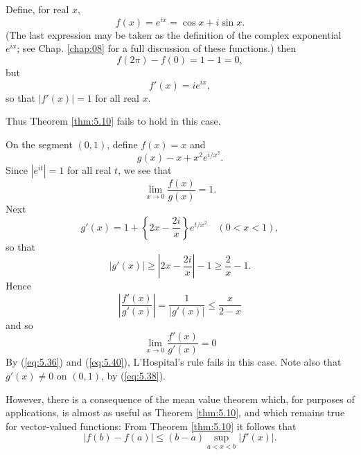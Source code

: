 \begin{newexample}
    Define, for real $x$,
    \begin{equation}
        \label{eq:5.32}
        f(x) = e^{ix} = \cos x + i \sin x.
    \end{equation}
    (The last expression may be taken as the definition of the complex exponential $e^{ix}$; see Chap. \ref{chap:08} for a full discussion of these functions.)
    then
    \begin{equation}
        \label{eq:5.33}
        f(2 \pi) - f(0) = 1 - 1 = 0,
    \end{equation}
    but
    \begin{equation}
        f'(x) = ie^{ix},
    \end{equation}
    so that $\left| f'(x) \right| = 1$ for all real $x$.

    Thus Theorem \ref{thm:5.10} fails to hold in this case.
\end{newexample}

\begin{newexample}
    On the segment $(0, 1)$, define $f(x) = x$ and
    \begin{equation}
        g(x) - x + x^2 e^{i/x^2}.
    \end{equation}
    Since $\left| e^{it} \right| = 1$ for all real $t$, we see that
    \begin{equation}
        \label{eq:5.36}
        \lim_{x \to 0} \frac{f(x)}{g(x)} = 1.
    \end{equation}
    Next
    \begin{equation}
        \label{eq:5.37}
        g'(x) = 1 + \left\{ 2x - \frac{2i}{x} \right\}e^{t/x^2}
        \quad (0 < x < 1),
    \end{equation}
    so that
    \begin{equation}
        \label{eq:5.38}
        \left| g'(x) \right| \geq
        \left| 2x - \frac{2i}{x} \right| -1 \geq
        \frac{2}{x} - 1.
    \end{equation}
    Hence
    \begin{equation}
        \label{eq:5.39}
        \left| \frac{f'(x)}{g'(x)} \right| =
        \frac{1}{\left| g'(x) \right|} \leq
        \frac{x}{2 - x}
    \end{equation}
    and so
    \begin{equation}
        \label{eq:5.40}
        \lim_{x \to 0} \frac{f'(x)}{g'(x)} = 0
    \end{equation}
    By (\ref{eq:5.36}) and (\ref{eq:5.40}),
    L'Hospital's rule fails in this case.
    Note also that $g'(x) \neq 0$ on $(0, 1)$, by (\ref{eq:5.38}).

    However, there is a consequence of the mean value theorem
    which, for purposes of applications,
    is almost as useful as Theorem \ref{thm:5.10},
    and which remains true for vector-valued functions:
    From Theorem \ref{thm:5.10} it follows that
    \begin{equation}
        \label{eq:5.41}
        \left| f(b) - f(a) \right| \leq
        (b-a) \sup_{a < x < b} \left| f'(x) \right| .
    \end{equation}
\end{newexample}


